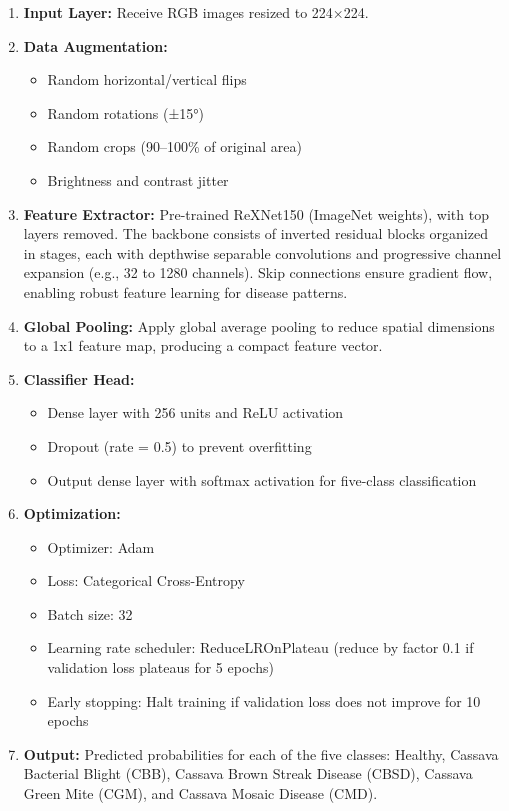\begin{enumerate}
    \item \textbf{Input Layer:} Receive RGB images resized to 224×224.
    \item \textbf{Data Augmentation:}
    \begin{itemize}
      \item Random horizontal/vertical flips
      \item Random rotations (±15°)
      \item Random crops (90–100\% of original area)
      \item Brightness and contrast jitter
    \end{itemize}
    \item \textbf{Feature Extractor:} Pre-trained ReXNet150 (ImageNet weights), with top layers removed. The backbone consists of inverted residual blocks organized in stages, each with depthwise separable convolutions and progressive channel expansion (e.g., 32 to 1280 channels). Skip connections ensure gradient flow, enabling robust feature learning for disease patterns.
    \item \textbf{Global Pooling:} Apply global average pooling to reduce spatial dimensions to a 1x1 feature map, producing a compact feature vector.
    \item \textbf{Classifier Head:}
    \begin{itemize}
      \item Dense layer with 256 units and ReLU activation
      \item Dropout (rate = 0.5) to prevent overfitting
      \item Output dense layer with softmax activation for five-class classification
    \end{itemize}
    \item \textbf{Optimization:}
    \begin{itemize}
      \item Optimizer: Adam
      \item Loss: Categorical Cross-Entropy
      \item Batch size: 32
      \item Learning rate scheduler: ReduceLROnPlateau (reduce by factor 0.1 if validation loss plateaus for 5 epochs)
      \item Early stopping: Halt training if validation loss does not improve for 10 epochs
    \end{itemize}
    \item \textbf{Output:} Predicted probabilities for each of the five classes: Healthy, Cassava Bacterial Blight (CBB), Cassava Brown Streak Disease (CBSD), Cassava Green Mite (CGM), and Cassava Mosaic Disease (CMD).
\end{enumerate}